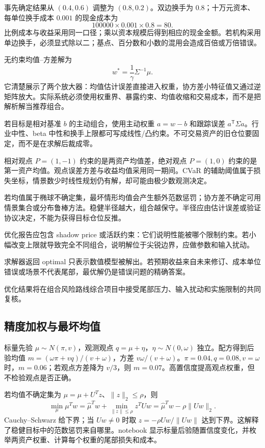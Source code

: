 事先确定结果从 $(0.4,0.6)$ 调整为 $(0.8,0.2)$。双边换手为 $0.8$；十万元资本、每单位换手成本 $0.001$ 的现金成本为
\[
 100000\times0.001\times0.8=80.
\]
比例成本与收益采用同一口径；乘以资本规模后得到相应的现金金额。若机构采用单边换手，必须显式除以二；基点、百分数和小数的混用会造成百倍或万倍错误。


无约束均值--方差解为
\[
w^*=\frac1\gamma\Sigma^{-1}\mu.
\]
它清楚展示了两个放大器：均值估计误差直接进入权重，协方差小特征值又通过逆矩阵放大。实际系统必须使用权重界、暴露约束、均值收缩和交易成本，而不是把解析解当推荐组合。

若目标是相对基准 $b$ 的主动组合，使用主动权重 $a=w-b$ 和跟踪误差 $a^{\mathsf T}\Sigma a$。行业中性、beta 中性和换手上限都可写成线性/凸约束。不可交易资产的旧仓位要固定，而不是在求解后裁成零。

相对观点 $P=(1,-1)$ 约束的是两资产均值差，绝对观点 $P=(1,0)$ 约束的是第一资产均值。观点误差方差与收益均值采用同一期间。CVaR 的辅助阈值属于损失坐标，情景数少时线性规划仍有解，却可能由极少数观测决定。


若均值属于椭球不确定集，最坏情形均值会产生额外范数惩罚；协方差不确定可用情景集合或分布鲁棒方法。稳健半径越大，组合越保守。半径应由估计误差或验证协议决定，不能为获得目标仓位反推。

优化报告应包含 shadow price 或活跃约束：它们说明性能被哪个限制约束。若小幅改变上限就导致完全不同组合，说明解位于尖锐边界，应做参数和输入扰动。

\begin{diagnostic}
求解器返回 optimal 只表示数值模型被解出。若预期收益来自未来修订、成本单位错误或场景不代表尾部，最优解仍是错误问题的精确答案。
\end{diagnostic}

优化结果将在组合风险路线综合项目中接受尾部压力、输入扰动和实施限制的共同复核。
\subsection{精度加权与最坏均值}

标量先验 $\mu\sim N(\pi,v)$，观测观点 $q=\mu+\eta$，$\eta\sim N(0,\omega)$ 独立。配方得到后验均值 $m=(\omega\pi+vq)/(v+\omega)$，方差 $v\omega/(v+\omega)$。$\pi=0.04,q=0.08,v=\omega$ 时，$m=0.06$；若观点方差降为 $v/3$，则 $m=0.07$。高置信度提高观点权重，但不检验观点是否正确。

若均值不确定集为 $\mu=\hat\mu+U^Tz$、$\|z\|_2\leq\rho$，则
\[
 \min_\mu\mu^Tw=\hat\mu^Tw+\min_{\|z\|\leq\rho}z^TUw
 =\hat\mu^Tw-\rho\|Uw\|_2.
\]
Cauchy--Schwarz 给下界；当 $Uw\ne0$ 时取 $z=-\rho Uw/\|Uw\|$ 达到下界。这解释了稳健目标中的范数惩罚来自哪里。notebook 显示标量后验随置信度变化，并枚举两资产权重、计算每个权重的尾部损失和成本。
